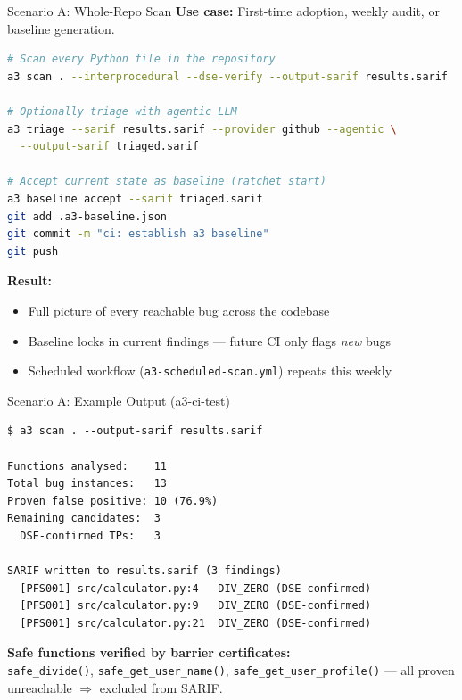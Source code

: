 \documentclass[aspectratio=169]{beamer}
\begin{document}
\begin{frame}[fragile]{Scenario A: Whole-Repo Scan}
\textbf{Use case:} First-time adoption, weekly audit, or baseline generation.

\begin{lstlisting}[language=bash]
# Scan every Python file in the repository
a3 scan . --interprocedural --dse-verify --output-sarif results.sarif

# Optionally triage with agentic LLM
a3 triage --sarif results.sarif --provider github --agentic \
  --output-sarif triaged.sarif

# Accept current state as baseline (ratchet start)
a3 baseline accept --sarif triaged.sarif
git add .a3-baseline.json
git commit -m "ci: establish a3 baseline"
git push
\end{lstlisting}

\textbf{Result:}
\begin{itemize}
  \item Full picture of every reachable bug across the codebase
  \item Baseline locks in current findings — future CI only flags \emph{new} bugs
  \item Scheduled workflow (\texttt{a3-scheduled-scan.yml}) repeats this weekly
\end{itemize}
\end{frame}

\begin{frame}[fragile]{Scenario A: Example Output (a3-ci-test)}
\begin{lstlisting}
$ a3 scan . --output-sarif results.sarif

Functions analysed:    11
Total bug instances:   13
Proven false positive: 10 (76.9%)
Remaining candidates:  3
  DSE-confirmed TPs:   3

SARIF written to results.sarif (3 findings)
  [PFS001] src/calculator.py:4   DIV_ZERO (DSE-confirmed)
  [PFS001] src/calculator.py:9   DIV_ZERO (DSE-confirmed)
  [PFS001] src/calculator.py:21  DIV_ZERO (DSE-confirmed)
\end{lstlisting}

\medskip
\textbf{Safe functions verified by barrier certificates:}\\
\texttt{safe\_divide()}, \texttt{safe\_get\_user\_name()}, \texttt{safe\_get\_user\_profile()} — all proven unreachable $\Rightarrow$ excluded from SARIF.
\end{frame}
\end{document}
